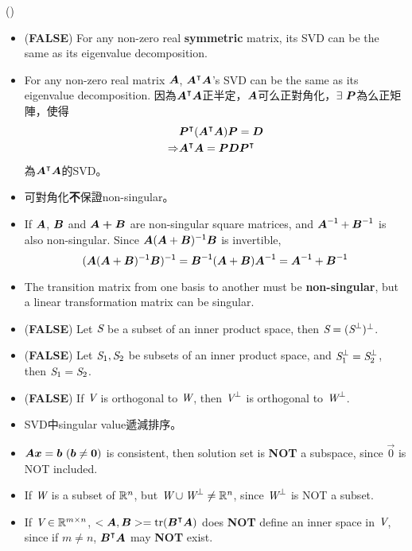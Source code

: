 \item \begin{theorem}{()} \quad\quad \begin{itemize}
        \item (\textbf{FALSE}) For any non-zero real \textbf{symmetric} matrix, its SVD can be the same as its eigenvalue decomposition.
        \item For any non-zero real matrix $\boldsymbol{A}$, $\boldsymbol{A}^\intercal\boldsymbol{A}$'s SVD can be the same as its eigenvalue decomposition. 
        因為$\boldsymbol{A}^\intercal\boldsymbol{A}$正半定，$\boldsymbol{A}$可么正對角化，$\exists \ \boldsymbol{P}$為么正矩陣，使得 \begin{equation}
            \begin{aligned}
                & \boldsymbol{P}^\intercal(\boldsymbol{A}^\intercal\boldsymbol{A})\boldsymbol{P} = \boldsymbol{D} \\
                \Rightarrow & \boldsymbol{A}^\intercal\boldsymbol{A} = \boldsymbol{P}\boldsymbol{D}\boldsymbol{P}^\intercal
            \end{aligned} 
        \end{equation} 為$\boldsymbol{A}^\intercal\boldsymbol{A}$的SVD。
        \item 可對角化\textbf{不}保證non-singular。
        \item If $\boldsymbol{A}$, $\boldsymbol{B}$ and $\boldsymbol{A + B}$ are non-singular square matrices, and $\boldsymbol{A}^{\mathsf{-1}} + \boldsymbol{B}^{\mathsf{-1}}$ is also non-singular.
        Since $\boldsymbol{A}(\boldsymbol{A} + \boldsymbol{B})^{\mathsf{-1}}\boldsymbol{B}$ is invertible, \begin{equation}
            (\boldsymbol{A}(\boldsymbol{A} + \boldsymbol{B})^{\mathsf{-1}}\boldsymbol{B})^{\mathsf{-1}} = \boldsymbol{B}^{\mathsf{-1}}(\boldsymbol{A} + \boldsymbol{B})\boldsymbol{A}^{\mathsf{-1}} = \boldsymbol{A}^{\mathsf{-1}} + \boldsymbol{B}^{\mathsf{-1}}
        \end{equation}
        \item The transition matrix from one basis to another must be \textbf{non-singular}, but a linear transformation matrix can be singular.
        \item (\textbf{FALSE}) Let $\textit{S}$ be a subset of an inner product space, then $\textit{S} = (\textit{S}^{\bot})^{\bot}$.
        \item (\textbf{FALSE}) Let $\textit{S}_1, \textit{S}_2$ be subsets of an inner product space, and $\textit{S}_1^{\bot} = \textit{S}_2^{\bot}$, then $\textit{S}_1 = \textit{S}_2$.
        \item (\textbf{FALSE}) If $\textit{V}$ is orthogonal to $\textit{W}$, then $\textit{V}^\bot$ is orthogonal to $\textit{W}^\bot$.
        \item SVD中singular value遞減排序。
        \item $\boldsymbol{A}\boldsymbol{x} = \boldsymbol{b} \ (\boldsymbol{b} \neq \boldsymbol{0})$ is consistent, then solution set is \textbf{NOT} a subspace, since $\vec{0}$ is NOT included.
        \item If $\textit{W}$ is a subset of $\mathbb{R}^n$, but $\textit{W} \cup \textit{W}^\perp \neq \mathbb{R}^n$, since $\textit{W}^\perp$ is NOT a subset.
        \item If $\textit{V} \in \mathbb{R}^{m \times n}$, $<\boldsymbol{A}, \boldsymbol{B}> = \operatorname{tr}(\boldsymbol{B}^\intercal\boldsymbol{A})$ does \textbf{NOT} define an inner space in $\textit{V}$, since if $m \neq n$, $\boldsymbol{B}^\intercal\boldsymbol{A}$ may \textbf{NOT} exist.
    \end{itemize}
\end{theorem}